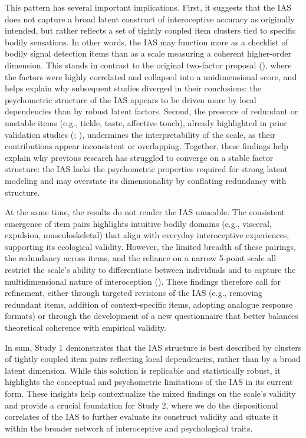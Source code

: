 \documentclass[
  jou,
  floatsintext,
  longtable,
  nolmodern,
  notxfonts,
  notimes,
  colorlinks=true,linkcolor=blue,citecolor=blue,urlcolor=blue]{apa7}
\begin{document}
This pattern has several important implications. First, it suggests that
the IAS does not capture a broad latent construct of interoceptive
accuracy as originally intended, but rather reflects a set of tightly
coupled item clusters tied to specific bodily sensations. In other
words, the IAS may function more as a checklist of bodily signal
detection items than as a scale measuring a coherent higher-order
dimension. This stands in contrast to the original two-factor proposal
(), where the factors were
highly correlated and collapsed into a unidimensional score, and helps
explain why subsequent studies diverged in their conclusions: the
psychometric structure of the IAS appears to be driven more by local
dependencies than by robust latent factors. Second, the presence of
redundant or unstable items (e.g., tickle, taste, affective touch),
already highlighted in prior validation studies
(;
), undermines the
interpretability of the scale, as their contributions appear
inconsistent or overlapping. Together, these findings help explain why
previous research has struggled to converge on a stable factor
structure: the IAS lacks the psychometric properties required for strong
latent modeling and may overstate its dimensionality by conflating
redundancy with structure.

At the same time, the results do not render the IAS unusable. The
consistent emergence of item pairs highlights intuitive bodily domains
(e.g., visceral, expulsion, musculoskeletal) that align with everyday
interoceptive experiences, supporting its ecological validity. However,
the limited breadth of these pairings, the redundancy across items, and
the reliance on a narrow 5-point scale all restrict the scale's ability
to differentiate between individuals and to capture the multidimensional
nature of interoception (). These findings therefore call for refinement, either
through targeted revisions of the IAS (e.g., removing redundant items,
addition of context-specific items, adopting analogue response formats)
or through the development of a new questionnaire that better balances
theoretical coherence with empirical validity.

In sum, Study 1 demonstrates that the IAS structure is best described by
clusters of tightly coupled item pairs reflecting local dependencies,
rather than by a broad latent dimension. While this solution is
replicable and statistically robust, it highlights the conceptual and
psychometric limitations of the IAS in its current form. These insights
help contextualize the mixed findings on the scale's validity and
provide a crucial foundation for Study 2, where we do the dispositional
correlates of the IAS to further evaluate its construct validity and
situate it within the broader network of interoceptive and psychological
traits.
\end{document}
